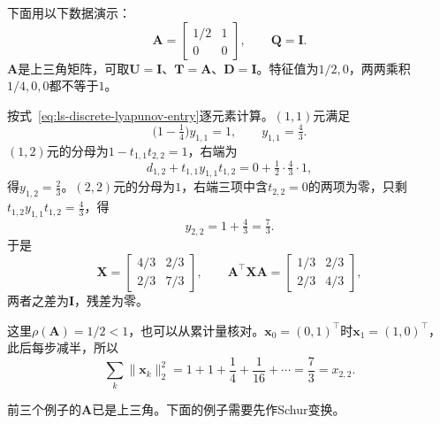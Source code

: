 \begin{example}[离散型方程的递推与累计量]
\label{ex:ls-discrete-lyapunov-recursion}
下面用以下数据演示：
\[
 \bm A=\begin{bmatrix}1/2&1\\0&0\end{bmatrix},\qquad \bm Q=\bm I .
\]
$\bm A$是上三角矩阵，可取$\bm U=\bm I$、$\bm T=\bm A$、$\bm D=\bm I$。特征值为$1/2,0$，两两乘积$1/4,0,0$都不等于$1$。

按式~\eqref{eq:ls-discrete-lyapunov-entry}逐元素计算。$(1,1)$元满足
\[
 \bigl(1-\tfrac14\bigr)y_{1,1}=1,\qquad y_{1,1}=\tfrac43 .
\]
$(1,2)$元的分母为$1-t_{1,1}t_{2,2}=1$，右端为
\[
 d_{1,2}+t_{1,1}y_{1,1}t_{1,2}=0+\tfrac12\cdot\tfrac43\cdot1,
\]
得$y_{1,2}=\tfrac23$。$(2,2)$元的分母为$1$，右端三项中含$t_{2,2}=0$的两项为零，只剩$t_{1,2}y_{1,1}t_{1,2}=\tfrac43$，得
\[
 y_{2,2}=1+\tfrac43=\tfrac73 .
\]
于是
\[
 \bm X=\begin{bmatrix}4/3&2/3\\2/3&7/3\end{bmatrix},\qquad
 \bm A^\top\bm X\bm A=\begin{bmatrix}1/3&2/3\\2/3&4/3\end{bmatrix},
\]
两者之差为$\bm I$，残差为零。

这里$\rho(\bm A)=1/2<1$，也可以从累计量核对。$\bm x_0=(0,1)^\top$时$\bm x_1=(1,0)^\top$，此后每步减半，所以
\[
 \sum_k\lVert\bm x_k\rVert_2^2=1+1+\frac14+\frac1{16}+\cdots=\frac73=x_{2,2}.
\]
\end{example}

前三个例子的$\bm A$已是上三角。下面的例子需要先作Schur变换。

